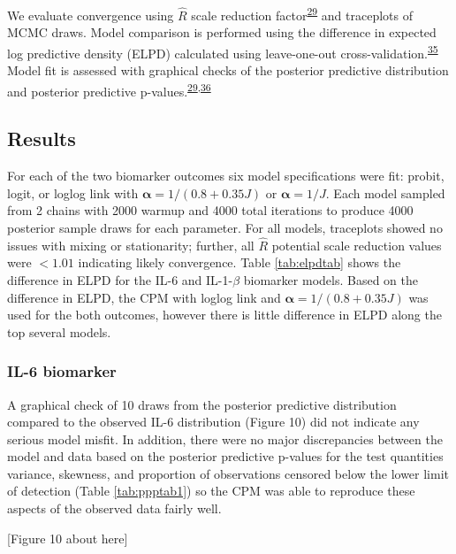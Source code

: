 \documentclass[
]{article}
\begin{document}
We evaluate convergence using \(\hat{R}\) scale reduction factor\textsuperscript{\protect\hyperlink{ref-gelman_bayesian_2014}{29}} and traceplots of MCMC draws. Model comparison is performed using the difference in expected log predictive density (ELPD) calculated using leave-one-out cross-validation.\textsuperscript{\protect\hyperlink{ref-vehtari_practical_2017}{35}} Model fit is assessed with graphical checks of the posterior predictive distribution and posterior predictive p-values.\textsuperscript{\protect\hyperlink{ref-gelman_bayesian_2014}{29},\protect\hyperlink{ref-stern_bayesian_2005}{36}}

\hypertarget{results-1}{%
\subsection{Results}\label{results-1}}

For each of the two biomarker outcomes six model specifications were fit: probit, logit, or loglog link with \(\boldsymbol{\alpha}=1/(0.8+0.35J)\) or \(\boldsymbol{\alpha}=1/J\). Each model sampled from 2 chains with 2000 warmup and 4000 total iterations to produce 4000 posterior sample draws for each parameter. For all models, traceplots showed no issues with mixing or stationarity; further, all \(\hat{R}\) potential scale reduction values were \(<1.01\) indicating likely convergence. Table \ref{tab:elpdtab} shows the difference in ELPD for the IL-6 and IL-1-\(\beta\) biomarker models. Based on the difference in ELPD, the CPM with loglog link and \(\boldsymbol{\alpha}=1/(0.8+0.35J)\) was used for the both outcomes, however there is little difference in ELPD along the top several models.

\hypertarget{il-6-biomarker}{%
\subsubsection{IL-6 biomarker}\label{il-6-biomarker}}

A graphical check of 10 draws from the posterior predictive distribution compared to the observed IL-6 distribution (Figure 10) did not indicate any serious model misfit. In addition, there were no major discrepancies between the model and data based on the posterior predictive p-values for the test quantities variance, skewness, and proportion of observations censored below the lower limit of detection (Table \ref{tab:ppptab1}) so the CPM was able to reproduce these aspects of the observed data fairly well.

{[}Figure 10 about here{]}
\end{document}
